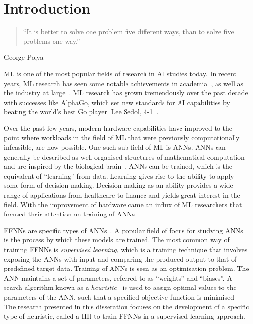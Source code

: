 \chapter{Introduction}\label{chap:introduction}

\begin{quotation}
      \noindent ``It is better to solve one problem five different ways, than to solve five problems one way.''
\end{quotation}
\begin{flushright}
      George Polya
\end{flushright}

\noindent
\Acf{ML} is one of the most popular fields of research in \acf{AI} studies today. In recent years, \acs{ML} research has seen some notable achievements in academia~\cite{ref:lecun:2015, ref:glorot:2010, ref:goodfellow:2014, ref:quoc:2017}, as well as the industry at large~\cite{ref:silver:2016, ref:silver:2017, ref:zoph:2017, ref:lewis:2017}.  \acs{ML} research has grown tremendously over the past decade with successes like AlphaGo, which set new standards for \acs{AI} capabilities by beating the world's best Go player, Lee Sedol, 4-1~\cite{ref:san-hun:2016}.

Over the past few years, modern hardware capabilities have improved to the point where workloads in the field of \acs{ML} that were previously computationally infeasible, are now possible. One such sub-field of \acs{ML} is \acp{ANN}. \acp{ANN} can generally be described as well-organised structures of mathematical computation and are inspired by the biological brain~\cite{ref:engelbrecht:2007}. \acp{ANN} can be trained, which is the equivalent of ``learning'' from data. Learning gives rise to the ability to apply some form of decision making. Decision making as an ability provides a wide-range of applications from healthcare to finance and yields great interest in the field. With the improvement of hardware came an influx of \acs{ML} researchers that focused their attention on training of \acp{ANN}.

\Acfp{FFNN} are specific types of \acp{ANN}~\cite{ref:reed:1999}. A popular field of focus for studying \acp{ANN} is the process by which these models are trained.  The most common way of training \acp{FFNN} is \textit{supervised learning}, which is a training technique that involves exposing the \acp{ANN} with input and comparing the produced output to that of predefined target data. Training of \acp{ANN} is seen as an optimisation problem. The \acs{ANN} maintains a set of parameters, referred to as ``weights'' and ``biases''. A search algorithm known as a \textit{heuristic}~\cite{ref:pearl:1984} is used to assign optimal values to the parameters of the \acs{ANN}, such that a specified objective function is minimised. The research presented in this disseration focuses on the development of a specific type of heuristic, called a \acf{HH} to train \acp{FFNN} in a supervised learning approach.

